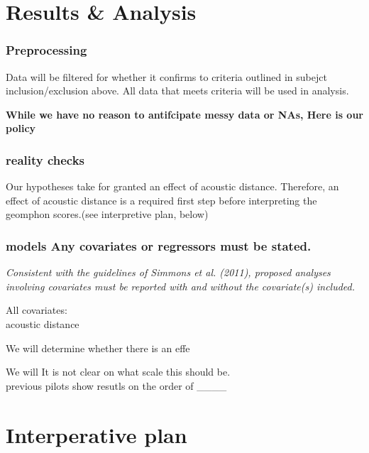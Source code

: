 \documentclass[]{article}
\begin{document}
\hypertarget{results-analysis}{%
\section{Results \& Analysis}\label{results-analysis}}

\hypertarget{preprocessing}{%
\subsubsection{Preprocessing}\label{preprocessing}}

Data will be filtered for whether it confirms to criteria outlined in
subejct inclusion/exclusion above. All data that meets criteria will be
used in analysis.

\textbf{While we have no reason to antifcipate messy data or NAs, Here
is our policy}

\hypertarget{reality-checks}{%
\subsubsection{reality checks}\label{reality-checks}}

Our hypotheses take for granted an effect of acoustic distance.
Therefore, an effect of acoustic distance is a required first step
before interpreting the geomphon scores.(see interpretive plan, below)

\hypertarget{models-any-covariates-or-regressors-must-be-stated.}{%
\subsubsection{models Any covariates or regressors must be
stated.}\label{models-any-covariates-or-regressors-must-be-stated.}}

\emph{Consistent with the guidelines of Simmons et al. (2011), proposed
analyses involving covariates must be reported with and without the
covariate(s) included.}

All covariates:\\
acoustic distance

We will determine whether there is an effe

We will It is not clear on what scale this should be.\\
previous pilots show resutls on the order of \_\_\_\_

\hypertarget{interperative-plan}{%
\section{Interperative plan}\label{interperative-plan}}
\end{document}
